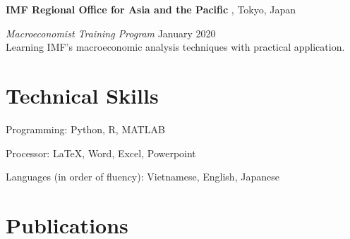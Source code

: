 \documentclass[a4paper,20pt]{article}
\begin{document}
	\textbf{IMF Regional Office for Asia and the Pacific }, Tokyo, Japan
	
	\hspace{4mm} \textit{Macroeconomist Training Program} \hfill {January 2020} \\
	\hspace{4mm} Learning IMF's macroeconomic analysis techniques with practical application.
	\vspace{4pt}
	
	
	\section{Technical Skills}
	\begin{description}
		\item Programming: Python, R, MATLAB
		\vspace*{-7pt}
		\item Processor: \LaTeX, Word, Excel, Powerpoint
		\vspace*{-7pt}
		\item Languages (in order of fluency): Vietnamese, English, Japanese
	\end{description}
	\vspace{4pt}
	
	\vspace{-5pt}
	\section{Publications}
	\nocite{*}
	
	
\end{document}
